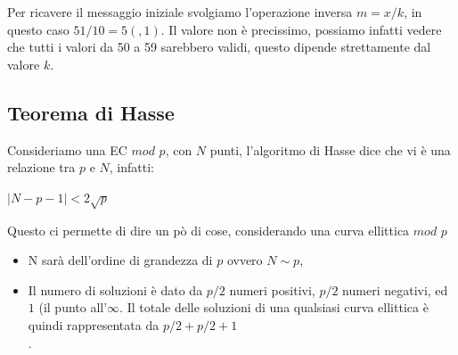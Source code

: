 \documentclass[11pt, oneside]{article}   	%
\begin{document}
Per ricavere il messaggio iniziale svolgiamo l'operazione inversa $m = x/k$, in questo caso $51/10 = 5(,1)$. Il valore non è precissimo, possiamo infatti vedere che tutti i valori da 50 a 59 sarebbero validi, questo dipende strettamente dal valore $k$. 

\subsection*{Teorema di Hasse}
Consideriamo una EC $mod$ $p$, con $N$ punti, l'algoritmo di Hasse dice che vi è una relazione tra $p$ e $N$, infatti:
\begin{center}
$|N - p - 1| < 2\sqrt p$
\end{center}
Questo ci permette di dire un pò di cose, considerando una curva ellittica $mod$ $p$
\begin{itemize}
\item N sarà dell'ordine di grandezza di $p$ ovvero $N \sim p$, 
\item Il numero di soluzioni è dato da $p/2$ numeri positivi, $p/2$ numeri negativi, ed $1$ (il punto all'$\infty$. Il totale delle soluzioni di una qualsiasi curva ellittica è quindi rappresentata da $p/2 + p/2 + 1$\\.
\end{itemize}
\end{document}
